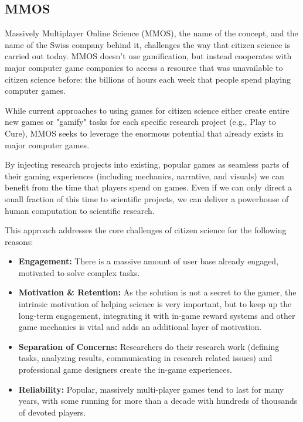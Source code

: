 \subsection{MMOS}

	Massively Multiplayer Online Science (MMOS), the name of the concept, and the name of the Swiss company behind it, challenges the way that citizen science is carried out today. MMOS doesn't use gamification, but instead cooperates with major computer game companies to access a resource that was unavailable to citizen science before: the billions of hours each week that people spend playing computer games.

	While current approaches to using games for citizen science either create entire new games or "gamify" tasks for each specific research project (e.g., Play to Cure), MMOS seeks to leverage the enormous potential that already exists in major computer games. 

	By injecting research projects into existing, popular games as seamless parts of their gaming experiences (including mechanics, narrative, and visuals) we can benefit from the time that players spend on games. Even if we can only direct a small fraction of this time to scientific projects, we can deliver a powerhouse of human computation to scientific research.

	This approach addresses the core challenges of citizen science for the following reasons:

	\begin{itemize}
	  \item {\bf Engagement:} There is a massive amount of user base already engaged, motivated to solve complex tasks.
	  \item {\bf Motivation \& Retention:} As the solution is not a secret to the gamer, the intrinsic motivation of helping science is very important, but to keep up the long-term engagement, integrating it with in-game reward systems and other game mechanics is vital and adds an additional layer of motivation.
	  \item {\bf Separation of Concerns:} Researchers do their research work (defining tasks, analyzing results, communicating in research related issues) and professional game designers create the in-game experiences.
	  \item {\bf Reliability:} Popular, massively multi-player games tend to last for many years, with some running for more than a decade with hundreds of thousands of devoted players.
	\end{itemize}

